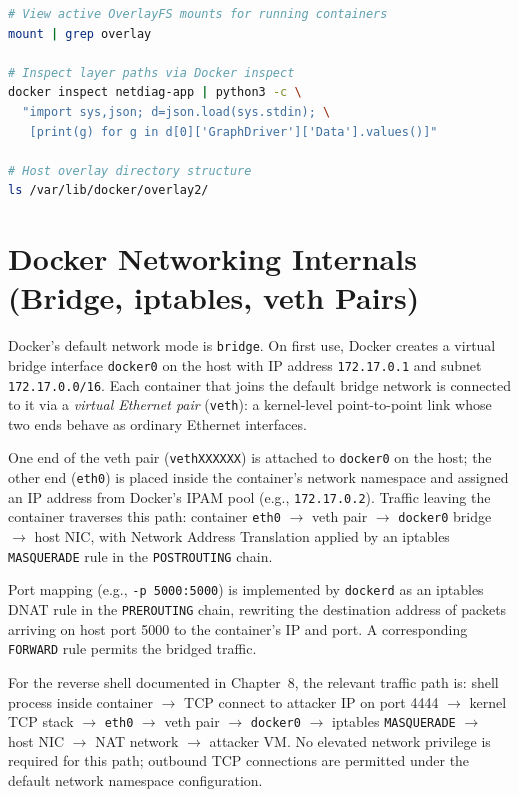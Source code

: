 \begin{lstlisting}[language=bash]
# View active OverlayFS mounts for running containers
mount | grep overlay

# Inspect layer paths via Docker inspect
docker inspect netdiag-app | python3 -c \
  "import sys,json; d=json.load(sys.stdin); \
   [print(g) for g in d[0]['GraphDriver']['Data'].values()]"

# Host overlay directory structure
ls /var/lib/docker/overlay2/
\end{lstlisting}


\section{Docker Networking Internals (Bridge, iptables, veth Pairs)}

Docker's default network mode is \texttt{bridge}. On first use, Docker creates a
virtual bridge interface \texttt{docker0} on the host with IP address
\texttt{172.17.0.1} and subnet \texttt{172.17.0.0/16}. Each container that joins
the default bridge network is connected to it via a \textit{virtual Ethernet pair}
(\texttt{veth}): a kernel-level point-to-point link whose two ends behave as ordinary
Ethernet interfaces.

One end of the veth pair (\texttt{vethXXXXXX}) is attached to \texttt{docker0} on
the host; the other end (\texttt{eth0}) is placed inside the container's network
namespace and assigned an IP address from Docker's IPAM pool (e.g.,
\texttt{172.17.0.2}). Traffic leaving the container traverses this path:
container \texttt{eth0} $\rightarrow$ veth pair $\rightarrow$ \texttt{docker0} bridge
$\rightarrow$ host NIC, with Network Address Translation applied by an iptables
\texttt{MASQUERADE} rule in the \texttt{POSTROUTING} chain.

Port mapping (e.g., \texttt{-p 5000:5000}) is implemented by \texttt{dockerd} as an
iptables DNAT rule in the \texttt{PREROUTING} chain, rewriting the destination
address of packets arriving on host port 5000 to the container's IP and port. A
corresponding \texttt{FORWARD} rule permits the bridged traffic.

For the reverse shell documented in Chapter~8, the relevant traffic path is: shell
process inside container $\rightarrow$ TCP connect to attacker IP on port 4444
$\rightarrow$ kernel TCP stack $\rightarrow$ \texttt{eth0} $\rightarrow$ veth pair
$\rightarrow$ \texttt{docker0} $\rightarrow$ iptables \texttt{MASQUERADE} $\rightarrow$
host NIC $\rightarrow$ NAT network $\rightarrow$ attacker VM. No elevated network
privilege is required for this path; outbound TCP connections are permitted under the
default network namespace configuration.


